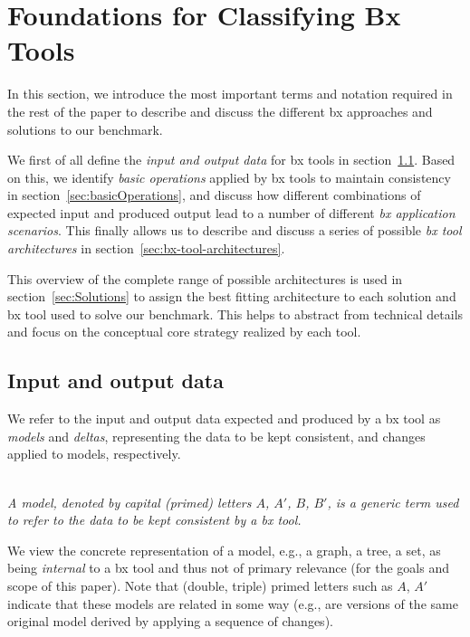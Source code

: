 \section{Foundations for Classifying Bx Tools}
\label{sec:Foundations}

In this section, we introduce the most important terms and notation required in the rest of the paper to describe and discuss the different bx approaches and solutions to our benchmark.

We first of all define the \emph{input and output data} for bx tools in section~\ref{sec:io-data}.
Based on this, we identify \emph{basic operations} applied by bx tools to maintain consistency in section~\ref{sec:basicOperations}, and discuss how different combinations of expected input and produced output lead to a number of different \emph{bx application scenarios}. 
This finally allows us to describe and discuss a series of possible \emph{bx tool architectures} in section~\ref{sec:bx-tool-architectures}.

This overview of the complete range of possible architectures is used in section~\ref{sec:Solutions} to assign the best fitting architecture to each solution and bx tool used to solve our benchmark.
This helps to abstract from technical details and focus on the conceptual core strategy realized by each tool.   

\subsection{Input and output data}
\label{sec:io-data}

We refer to the input and output data expected and produced by a bx tool as \emph{models} and \emph{deltas}, representing the data to be kept consistent, and changes applied to models, respectively.  

\begin{definition}[Model]
\label{def: model}~\\
\emph{A model, denoted by capital (primed) letters $A$, $A'$, $B$, $B'$, is a generic term used to refer to the data to be kept consistent by a bx tool.}
\end{definition}
%
We view the concrete representation of a model, e.g., a graph, a tree, a set, as being \emph{internal} to a bx tool and thus not of primary relevance (for the goals and scope of this paper).
Note that (double, triple) primed letters such as $A$, $A'$ indicate that these models are related in some way (e.g., are versions of the same original model derived by applying a sequence of changes).

